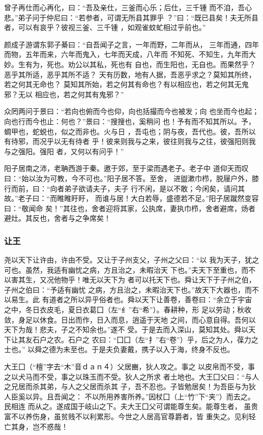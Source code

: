 \documentclass[]{article}
\begin{document}
曾子再仕而心再化，曰：``吾及亲仕，三釜而心乐；后仕，三千锺
而不洎，吾心悲。''弟子问于仲尼曰：``若参者，可谓无所县其罪乎
？''曰：``既已县矣！夫无所县者，可以有哀乎？彼视三釜、三千锺
，如观雀蚊虻相过乎前也。''

颜成子游谓东郭子綦曰：``自吾闻子之言，一年而野，二年而从，
三年而通，四年而物，五年而来，六年而鬼入，七年而天成，八年而
不知死、不知生，九年而大妙。生有为，死也。劝公以其私，死也有
自也，而生阳也，无自也。而果然乎？恶乎其所适，恶乎其所不适？
天有历数，地有人据，吾恶乎求之？莫知其所终，若之何其无命也？
莫知其所始，若之何其有命也？有以相应也，若之何其无鬼邪？无以
相应也，若之何其有鬼邪？''

众罔两问于景曰：``若向也俯而今也仰，向也括撮而今也被发；向
也坐而今也起；向也行而今也止：何也？''景曰：``搜搜也，奚稍问
也！予有而不知其所以。予，蜩甲也，蛇蜕也，似之而非也。火与日
，吾屯也；阴与夜，吾代也。彼，吾所以有待邪，而况乎以无有待者
乎！彼来则我与之来，彼往则我与之往，彼强阳则我与之强阳。强阳
者，又何以有问乎！''

阳子居南之沛，老聃西游于秦。邀于郊，至于梁而遇老子。老子中
道仰天而叹曰：``始以汝为可教，今不可也。''阳子居不答。至舍，
进盥漱巾栉，脱屦户外，膝行而前，曰：``向者弟子欲请夫子，夫子
行不闲，是以不敢；今闲矣，请问其故。''老子曰：``而睢睢盱盱，
而谁与居！大白若辱，盛德若不足。''阳子居蹴然变容曰：``敬闻命
矣！''其往也，舍者迎将其家，公执席，妻执巾栉，舍者避席，炀者
避灶。其反也，舍者与之争席矣！

\hypertarget{header-n2358}{%
\subsubsection{让王}\label{header-n2358}}

尧以天下让许由，许由不受。又让于子州支父，子州之父曰：``以
我为天子，犹之可也。虽然，我适有幽忧之病，方且治之，未暇治天
下也。''夫天下至重也，而不以害其生，又况他物乎！唯无以天下为
者可以托天下也。舜让天下于子州之伯，子州之伯曰：``予适有幽忧
之病，方且治之，未暇治天下也。''故天下大器也，而不以易生。此
有道者之所以异乎俗者也。舜以天下让善卷，善卷曰：``余立于宇宙
之中，冬日衣皮毛，夏日衣葛囗（左``纟''右``希''）。春耕种，形
足以劳动；秋收敛，身足以休食。日出而作，日入而息，逍遥于天地
之间，而心意自得。吾何以天下为哉！悲夫，子之不知余也。''遂不
受。于是去而入深山，莫知其处。舜以天下让其友石户之农。石户之
农曰：``囗囗（左``扌''右``卷''）乎，后之为人，葆力之士也。''
以舜之德为未至也。于是夫负妻戴，携子以入于海，终身不反也。

大王囗（``檀''字去``木''音ｄａｎ４）父居豳，狄人攻之。事之
以皮帛而不受，事之以犬马而不受，事之以珠玉而不受。狄人之所求
者土地也。大王囗父曰：``与人之兄居而杀其弟，与人之父居而杀其
子，吾不忍也。子皆勉居矣！为吾臣与为狄人臣奚以异。且吾闻之：
不以所用养害所养。''因杖囗（上``竹''下``夹''）而去之。民相连
而从之。遂成国于岐山之下。夫大王囗父可谓能尊生矣。能尊生者，
虽贵富不以养伤身，虽贫贱不以利累形。今世之人居高官尊爵者，皆
重失之。见利轻亡其身，岂不惑哉！
\end{document}
